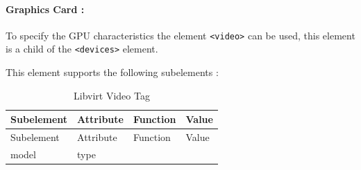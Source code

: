 \documentclass[
  14pt,
  english,
  a4paper,
]{scrreprt}
\begin{document}
\hypertarget{graphics-card}{%
\paragraph*{Graphics Card :}\label{graphics-card}}

To specify the GPU characteristics the element
\texttt{\textless{}video\textgreater{}} can be used, this element is a
child of the \texttt{\textless{}devices\textgreater{}} element.

This element supports the following subelements :

\hypertarget{tbl:lvirt_gpu_tag}{}
\begin{longtable}[]{@{}llll@{}}
\caption{\label{tbl:lvirt_gpu_tag}Libvirt Video Tag}\tabularnewline
\toprule
\begin{minipage}[b]{0.12\columnwidth}\raggedright
Subelement\strut
\end{minipage} & \begin{minipage}[b]{0.10\columnwidth}\raggedright
Attribute\strut
\end{minipage} & \begin{minipage}[b]{0.09\columnwidth}\raggedright
Function\strut
\end{minipage} & \begin{minipage}[b]{0.57\columnwidth}\raggedright
Value\strut
\end{minipage}\tabularnewline
\midrule
\endfirsthead
\toprule
\begin{minipage}[b]{0.12\columnwidth}\raggedright
Subelement\strut
\end{minipage} & \begin{minipage}[b]{0.10\columnwidth}\raggedright
Attribute\strut
\end{minipage} & \begin{minipage}[b]{0.09\columnwidth}\raggedright
Function\strut
\end{minipage} & \begin{minipage}[b]{0.57\columnwidth}\raggedright
Value\strut
\end{minipage}\tabularnewline
\midrule
\endhead
\begin{minipage}[t]{0.12\columnwidth}\raggedright
model\strut
\end{minipage} & \begin{minipage}[t]{0.10\columnwidth}\raggedright
type\strut
\end{minipage} & \begin{minipage}[t]{0.09\columnwidth}\raggedright

\end{minipage}
\end{longtable}
\end{document}
